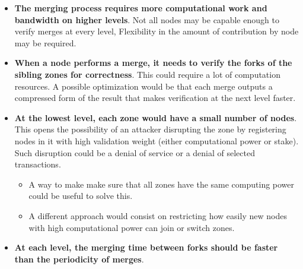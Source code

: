 \documentclass[portrait,ansidpaper,fontscale=0.445]{baposter} %
\begin{document}
\begin{poster}
{\begin{itemize}[leftmargin=1em]
    \item \textbf{The merging process requires more computational work and bandwidth on
        higher levels}.  Not all nodes may be capable enough to verify merges at
        every level,  Flexibility in the amount of contribution by node may be
        required.
    \item \textbf{When a node performs a merge, it needs to verify the forks of the
        sibling zones for correctness}.  This could require a lot of computation
        resources.  A possible optimization would be that each merge outputs a
        compressed form of the result that makes verification at the next level
        faster.
    \item \textbf{At the lowest level, each zone would have a small number of nodes}.
        This opens the possibility of an attacker disrupting the zone by
        registering nodes in it with high validation weight (either
        computational power or stake).  Such disruption could be a denial of
        service or a denial of selected transactions.
    \begin{itemize}[leftmargin=1em]
        \item A way to make make sure that all zones have the same computing
            power could be useful to solve this.
        \item A different approach would consist on restricting how easily new
            nodes with high computational power can join or switch zones.
    \end{itemize}
    \item \textbf{At each level, the merging time between forks should be faster than the
        periodicity of merges}.
\end{itemize}

}



\end{poster}
\end{document}
